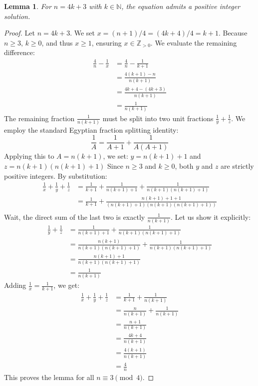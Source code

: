 \documentclass[12pt, a4paper]{article}
\newtheorem{lemma}[theorem]{Lemma}
\begin{document}
\begin{lemma}
For $n = 4k+3$ with $k \in \mathbb{N}$, the equation admits a positive integer solution.
\end{lemma}
\begin{proof}
Let $n = 4k+3$.
We set $x = (n+1)/4 = (4k+4)/4 = k+1$. Because $n \ge 3$, $k \ge 0$, and thus $x \ge 1$, ensuring $x \in \mathbb{Z}_{>0}$.
We evaluate the remaining difference:
\begin{align*}
\frac{4}{n} - \frac{1}{x} &= \frac{4}{n} - \frac{1}{k+1} \\
&= \frac{4(k+1) - n}{n(k+1)} \\
&= \frac{4k+4 - (4k+3)}{n(k+1)} \\
&= \frac{1}{n(k+1)}
\end{align*}
The remaining fraction $\frac{1}{n(k+1)}$ must be split into two unit fractions $\frac{1}{y} + \frac{1}{z}$.
We employ the standard Egyptian fraction splitting identity:
\[ \frac{1}{A} = \frac{1}{A+1} + \frac{1}{A(A+1)} \]
Applying this to $A = n(k+1)$, we set:
$y = n(k+1) + 1$
and
$z = n(k+1)(n(k+1)+1)$
Since $n \ge 3$ and $k \ge 0$, both $y$ and $z$ are strictly positive integers.
By substitution:
\begin{align*}
\frac{1}{x} + \frac{1}{y} + \frac{1}{z} &= \frac{1}{k+1} + \frac{1}{n(k+1) + 1} + \frac{1}{n(k+1)(n(k+1)+1)} \\
&= \frac{1}{k+1} + \frac{n(k+1)+1 + 1}{(n(k+1)+1)(n(k+1)(n(k+1)+1))} \\
\end{align*}
Wait, the direct sum of the last two is exactly $\frac{1}{n(k+1)}$. Let us show it explicitly:
\begin{align*}
\frac{1}{y} + \frac{1}{z} &= \frac{1}{n(k+1)+1} + \frac{1}{n(k+1)(n(k+1)+1)} \\
&= \frac{n(k+1)}{n(k+1)(n(k+1)+1)} + \frac{1}{n(k+1)(n(k+1)+1)} \\
&= \frac{n(k+1)+1}{n(k+1)(n(k+1)+1)} \\
&= \frac{1}{n(k+1)}
\end{align*}
Adding $\frac{1}{x} = \frac{1}{k+1}$, we get:
\begin{align*}
\frac{1}{x} + \frac{1}{y} + \frac{1}{z} &= \frac{1}{k+1} + \frac{1}{n(k+1)} \\
&= \frac{n}{n(k+1)} + \frac{1}{n(k+1)} \\
&= \frac{n+1}{n(k+1)} \\
&= \frac{4k+4}{n(k+1)} \\
&= \frac{4(k+1)}{n(k+1)} \\
&= \frac{4}{n}
\end{align*}
This proves the lemma for all $n \equiv 3 \pmod 4$.
\end{proof}
\end{document}
